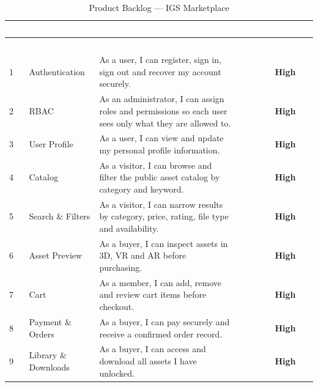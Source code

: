 \begingroup
\footnotesize
\setlength{\tabcolsep}{4pt}
\renewcommand{\arraystretch}{1.3}
\begin{longtable}{|C{0.6cm}|L{3.2cm}|L{7.8cm}|C{1.2cm}|C{1.6cm}|}

\caption{Product Backlog --- IGS Marketplace}
\label{tab:backlog}\\

\textcolor{white}{\textbf{ID}} &
\textcolor{white}{\textbf{Feature}} &
\textcolor{white}{\textbf{User Story}} &
\textcolor{white}{\textbf{Sprint}} &
\textcolor{white}{\textbf{Priority}} \\
\endfirsthead

\textcolor{white}{\textbf{ID}} &
\textcolor{white}{\textbf{Feature}} &
\textcolor{white}{\textbf{User Story}} &
\textcolor{white}{\textbf{Sprint}} &
\textcolor{white}{\textbf{Priority}} \\
\endhead

1 & Authentication & As a user, I can register, sign in, sign out and recover my account securely. &  & \textbf{High} \\\hline
{}
2 & RBAC & As an administrator, I can assign roles and permissions so each user sees only what they are allowed to. &  & \textbf{High} \\\hline
{}
3 & User Profile & As a user, I can view and update my personal profile information. &  & \textbf{High} \\\hline

4 & Catalog & As a visitor, I can browse and filter the public asset catalog by category and keyword. &  & \textbf{High} \\\hline
{}
5 & Search \& Filters & As a visitor, I can narrow results by category, price, rating, file type and availability. &  & \textbf{High} \\\hline
{}
6 & Asset Preview & As a buyer, I can inspect assets in 3D, VR and AR before purchasing. &  & \textbf{High} \\\hline
{}
7 & Cart & As a member, I can add, remove and review cart items before checkout. &  & \textbf{High} \\\hline
{}
8 & Payment \& Orders & As a buyer, I can pay securely and receive a confirmed order record. &  & \textbf{High} \\\hline
{}
9 & Library \& Downloads & As a buyer, I can access and download all assets I have unlocked. &  & \textbf{High} \\\hline


\end{longtable}
